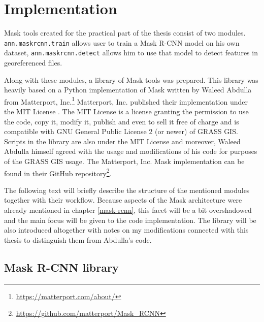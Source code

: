 \chapter{Implementation}
\label{implementation}

Mask  tools created for the practical part of the thesis consist of two modules. \verb|ann.maskrcnn.train| allows user to train a Mask R-CNN model on his own dataset, \verb|ann.maskrcnn.detect| allows him to use that model to detect features in georeferenced files. 

Along with these modules, a library of Mask  tools was prepared. This library was heavily based on a Python implementation of Mask  written by Waleed Abdulla from Matterport, Inc.\footnote{\url{https://matterport.com/about/}}  Matterport, Inc. published their implementation under the MIT License \cite{mit}. The MIT License is a license granting the permission to use the code, copy it, modify it, publish and even to sell it free of charge and is compatible with GNU General Public License 2 (or newer) \cite{gplv2} of GRASS GIS. Scripts in the library are also under the MIT License and moreover, Waleed Abdulla himself agreed with the usage and modifications of his code for purposes of the GRASS GIS usage. The Matterport, Inc. Mask  implementation can be found in their GitHub repository\footnote{\url{https://github.com/matterport/Mask\_RCNN}}.


The following text will briefly describe the structure of the mentioned modules together with their workflow. Because aspects of the Mask  architecture were already mentioned in chapter \ref{mask-rcnn}, this facet will be a bit overshadowed and the main focus will be given to the code implementation. The library will be also introduced altogether with notes on my modifications connected with this thesis to distinguish them from Abdulla's code.

\section{Mask R-CNN library}
\label{library}

